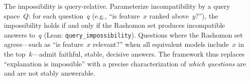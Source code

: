
The impossibility is query-relative.
Parameterize incompatibility by a query space~$Q$:
for each question~$q$ (e.g., ``is feature~$x$ ranked above~$y$?''),
the impossibility holds if and only if the Rashomon set produces
incompatible answers to~$q$ (Lean: \texttt{query\_impossibility}).
Questions where the Rashomon set agrees---such as
``is feature~$x$ relevant?'' when all equivalent models
include~$x$ in the top~$k$---admit faithful, stable, decisive answers.
The framework thus replaces ``explanation is impossible'' with a
precise characterization of \emph{which questions} are and are not
stably answerable.
